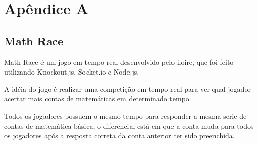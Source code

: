 \chapter{Apêndice A}
\label{apendiceA}

\section{Math Race}

Math Race é um jogo em tempo real desenvolvido pelo iloire, que foi feito utilizando Knockout.js, Socket.io e Node.js.

A idéia do jogo é realizar uma competição em tempo real para ver qual jogador acertar mais contas de matemáticas em determinado tempo.

Todos os jogadores possuem o mesmo tempo para responder a mesma serie de contas de matemática básica, o diferencial está em que a conta muda para todos os jogadores após a resposta correta da conta anterior ter sido preenchida.
 